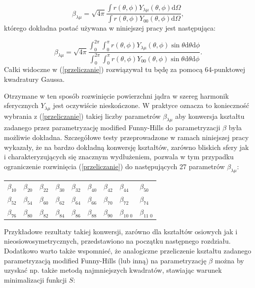 \documentclass[a4paper,polish,twoside]{article}
\numberwithin{equation}{section}
\begin{document}
\begin{equation}
\beta_{\lambda \mu}=\sqrt{4\pi}\frac{\int r(\theta,\phi)Y_{\lambda \mu}
(\theta,\phi)\mathrm{d}\Omega}{\int r(\theta,\phi)Y_{0 0}(\theta,\phi)\mathrm{d}\Omega},
\end{equation}
którego dokładna postać używana w niniejszej pracy jest następująca:

\begin{equation}\label{przeliczanie}
\beta_{\lambda \mu}=\sqrt{4\pi}
\frac{\int_{0}^{2\pi}\int_{0}^{\pi}r(\theta,\phi)Y_{\lambda \mu}(\theta,\phi)\sin{\theta}\mathrm{d}\theta\mathrm{d}\phi}
{\int_{0}^{2\pi}\int_{0}^{\pi}r(\theta,\phi)Y_{0 0}(\theta,\phi)\sin{\theta}\mathrm{d}\theta\mathrm{d}\phi}.
\end{equation}
Całki widoczne w (\ref{przeliczanie}) rozwiązywał tu będę za pomocą 64-punktowej kwadratury Gaussa.

Otrzymane w ten sposób rozwinięcie powierzchni jądra w szereg harmonik sferycznych $Y_{\lambda \mu}$ jest oczywiście nieskończone. W praktyce oznacza to konieczność wybrania z (\ref{przeliczanie}) takiej liczby parametrów $\beta_{\lambda \mu}$ aby konwersja kształtu zadanego przez parametryzację modified Funny-Hills do parametryzacji $\beta$ była możliwie dokładna. Szczegółowe testy przeprowadzone w ramach niniejszej pracy wykazały, że na bardzo dokładną konwersję kształtów, zarówno bliskich sfery jak i charakteryzujących się znacznym wydłużeniem, pozwala w tym przypadku ograniczenie rozwinięcia (\ref{przeliczanie}) do następujących 27 parametrów $\beta_{\lambda \mu}$: \\

\begin{table}[h!]
\begin{center}
\begin{tabular}{cccccccll}
$\beta_{10}$ & $\beta_{20}$ & $\beta_{22}$ & $\beta_{30}$ & $\beta_{32}$ & $\beta_{40}$ & $\beta_{42}$ & $\beta_{44}$ & $\beta_{50}$\\
$\beta_{52}$ & $\beta_{54}$ & $\beta_{60}$ & $\beta_{62}$ & $\beta_{64}$ & $\beta_{66}$ & $\beta_{70}$ & $\beta_{72}$ & $\beta_{74}$\\
$\beta_{76}$ & $\beta_{80}$ & $\beta_{82}$ & $\beta_{84}$ & $\beta_{86}$ & $\beta_{88}$ & $\beta_{90}$ & $\beta_{10 \,\, 0}$ & $\beta_{11 \,\, 0}$ \\
\end{tabular}
\end{center}
\end{table}
Przykładowe rezultaty takiej konwersji, zarówno dla kształtów osiowych jak i nieosiowosymetrycznych, przedstawiono na początku następnego rozdziału. Dodatkowo warto także wspomnieć, że analogiczne przeliczenie kształtu zadanego parametryzacją modified Funny-Hills (lub inną) na parametryzację $\beta$ można by uzyskać np. także metodą najmniejszych kwadratów, stawiając warunek minimalizacji funkcji $S$:
\end{document}
